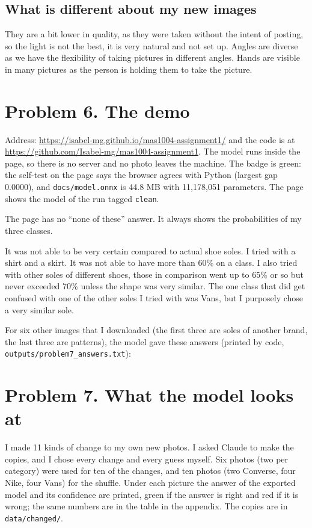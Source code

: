 \documentclass[11pt]{article}
\begin{document}
\subsection*{What is different about my new images}
They are a bit lower in quality, as they were taken without the intent of posting, so the light is not the best, it is very natural and not set up. Angles are diverse as we have the flexibility of taking pictures in different angles. Hands are visible in many pictures as the person is holding them to take the picture.

\section*{Problem 6. The demo}
Address: \url{https://isabel-mg.github.io/mas1004-assignment1/} and the code is at \url{https://github.com/Isabel-mg/mas1004-assignment1}. The model runs inside the page, so there is no server and no photo leaves the machine. The badge is green: the self-test on the page says the browser agrees with Python (largest gap 0.0000), and \texttt{docs/model.onnx} is 44.8 MB with 11,178,051 parameters. The page shows the model of the run tagged \texttt{clean}.

The page has no ``none of these'' answer. It always shows the probabilities of my three classes.

It was not able to be very certain compared to actual shoe soles. I tried with a shirt and a skirt. It was not able to have more than 60\% on a class. I also tried with other soles of different shoes, those in comparison went up to 65\% or so but never exceeded 70\% unless the shape was very similar. The one class that did get confused with one of the other soles I tried with was Vans, but I purposely chose a very similar sole.

For six other images that I downloaded (the first three are soles of another brand, the last three are patterns), the model gave these answers (printed by code, \texttt{outputs/problem7\_answers.txt}):


\section*{Problem 7. What the model looks at}
I made 11 kinds of change to my own new photos. I asked Claude to make the copies, and I chose every change and every guess myself. Six photos (two per category) were used for ten of the changes, and ten photos (two Converse, four Nike, four Vans) for the shuffle. Under each picture the answer of the exported model and its confidence are printed, green if the answer is right and red if it is wrong; the same numbers are in the table in the appendix. The copies are in \texttt{data/changed/}.
\end{document}
